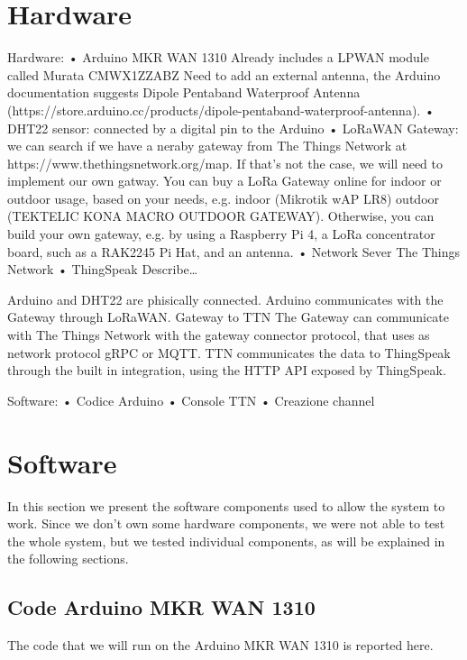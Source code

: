 \section{Hardware}

Hardware:
•	Arduino MKR WAN 1310
Already includes a LPWAN module called Murata CMWX1ZZABZ
Need to add an external antenna, the Arduino documentation suggests Dipole Pentaband Waterproof Antenna (https://store.arduino.cc/products/dipole-pentaband-waterproof-antenna).
•	DHT22 sensor: connected by a digital pin to the Arduino
•	LoRaWAN Gateway: we can search if we have a neraby gateway from The Things Network at https://www.thethingsnetwork.org/map. If that’s not the case, we will need to implement our own gatway. 
You can buy a LoRa Gateway online for indoor or outdoor usage, based on your needs, e.g. indoor (Mikrotik wAP LR8) outdoor (TEKTELIC KONA MACRO OUTDOOR GATEWAY).
Otherwise, you can build your own gateway, e.g. by using a Raspberry Pi 4, a  LoRa concentrator board, such as a RAK2245 Pi Hat, and an antenna.
•	Network Sever The Things Network
•	ThingSpeak
Describe…

Arduino and DHT22 are phisically connected.
Arduino communicates with the Gateway through LoRaWAN.
Gateway to TTN 
The Gateway can communicate with The Things Network with the gateway connector protocol, that uses as network protocol gRPC or MQTT.
TTN communicates the data to ThingSpeak through the built in integration, using the HTTP API exposed by ThingSpeak.

Software:
•	Codice Arduino 
•	Console TTN
•	Creazione channel 

\section{Software}
\label{sec:software}
In this section we present the software components used to allow the system to work. Since we don't own some hardware components, we were not able to test the whole system, but we tested individual components, as will be explained in the following sections.

\subsection{Code Arduino MKR WAN 1310}
The code that we will run on the Arduino MKR WAN 1310 is reported here.

